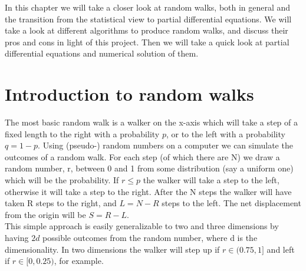 
In this chapter we will take a closer look at random walks, both in general and the transition from the statistical view to partial differential equations. 
We will take a look at different algorithms to produce random walks, and discuss their pros and cons in light of this project. 
Then we will take a quick look at partial differential equations and numerical solution of them.

\section{Introduction to random walks}\label{introduction_to_random_walks}
The most basic random walk is a walker on the x-axis which will take a step of a fixed length to the right with a probability $p$, or to the left with a probability $q=1-p$. 
Using (pseudo-) random numbers on a computer we can simulate the outcomes of a random walk. 
For each step (of which there are N) we draw a random number, r, between 0 and 1 from some distribution (say a uniform one) which will be the probability. 
If $r\leq p$ the walker will take a step to the left, otherwise it will take a step to the right. 
After the N steps the walker will have taken R steps to the right, and $L = N-R$ steps to the left. 
The net displacement from the origin will be $S = R-L$. \\
This simple approach is easily generalizable to two and three dimensions by having $2d$ possible outcomes from the random number, where d is the dimensionality. 
In two dimensions the walker will step up if $r\in(0.75,1]$ and left if $r\in[0,0.25)$, for example.

